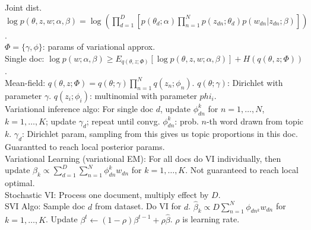 Joint dist. $\log p(\theta, z, w; \alpha, \beta) = \log ( \prod_{d=1}^D [ p(\theta_d; \alpha) \prod_{n=1}^N p(z_{dn}; \theta_d) p(w_{dn} | z_{dn}; \beta) ] )$.\\
$\Phi = \{\gamma, \phi\}$: params of variational approx.\\
Single doc: $\log p(w; \alpha, \beta) \geq E_{q(\theta, z; \Phi)}[\log p(\theta, z, w; \alpha, \beta)] + H(q(\theta, z; \Phi))$.\\
Mean-field: $q(\theta, z; \Phi) = q(\theta; \gamma)\prod_{n=1}^N q(z_n; \phi_n)$. $q(\theta; \gamma)$: Dirichlet with parameter $\gamma$. $q(z_i; \phi_i)$: multinomial with parameter $phi_i$.\\
Variational inference algo: For single doc $d$, update $\phi_{dn}^k$ for $n=1, \dots, N$, $k=1, \dots, K$; update $\gamma_d$; repeat until convg. $\phi_{dn}^k$: prob. $n$-th word drawn from topic $k$. $\gamma_d$: Dirichlet param, sampling from this gives us topic proportions in this doc. Guarantted to reach local posterior params.\\
Variational Learning (variational EM): For all docs do VI individually, then update $\beta_k \propto \sum_{d=1}^D \sum_{n=1}^N \phi_{dn}^k w_{dn}$ for $k=1, \dots, K$. Not guaranteed to reach local optimal.\\
Stochastic VI: Process one document, multiply effect by $D$.\\
SVI Algo: Sample doc $d$ from dataset. Do VI for $d$. $\hat{\beta}_k \propto D \sum_{n=1}^N \phi_{dn^k} w_{dn}$ for $k=1, \dots, K$. Update $\beta^t \leftarrow (1-\rho)\beta^{t-1} + \rho \hat{\beta}$. $\rho$ is learning rate.
